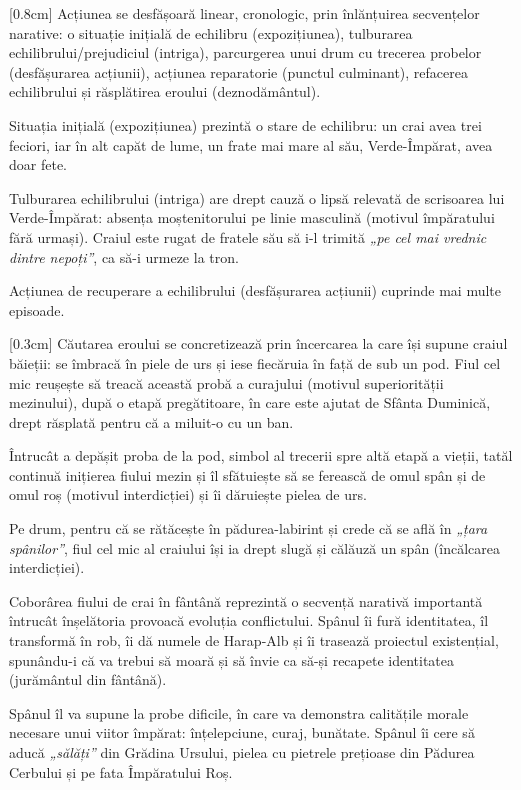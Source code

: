 [0.8cm]
Acțiunea se desfășoară linear, cronologic, prin înlănțuirea secvențelor narative: o situație inițială de echilibru (expozițiunea), tulburarea echilibrului/prejudiciul (intriga), parcurgerea unui drum cu trecerea probelor (desfășurarea acțiunii), acțiunea reparatorie (punctul culminant), refacerea echilibrului și răsplătirea eroului (deznodământul).

Situația inițială (expozițiunea) prezintă o stare de echilibru: un crai avea trei feciori, iar în alt capăt de lume, un frate mai mare al său, Verde-Împărat, avea doar fete.

Tulburarea echilibrului (intriga) are drept cauză o lipsă relevată de scrisoarea lui Verde-Împărat: absența moștenitorului pe linie masculină (motivul împăratului fără urmași). Craiul este rugat de fratele său să i-l trimită \textit{„pe cel mai vrednic dintre nepoți”}, ca să-i urmeze la tron.

Acțiunea de recuperare a echilibrului (desfășurarea acțiunii) cuprinde mai multe episoade.

[0.3cm]
Căutarea eroului se concretizează prin încercarea la care își supune craiul băieții: se îmbracă în piele de urs și iese fiecăruia în față de sub un pod. Fiul cel mic reușește să treacă această probă a curajului (motivul superiorității mezinului), după o etapă pregătitoare, în care este ajutat de Sfânta Duminică, drept răsplată pentru că a \hbox{miluit-o} cu un ban.

Întrucât a depășit proba de la pod, simbol al trecerii spre altă etapă a vieții, tatăl continuă inițierea fiului mezin și îl sfătuiește să se ferească de omul spân și de omul roș (motivul interdicției) și îi dăruiește pielea de urs.

Pe drum, pentru că se rătăcește în pădurea-labirint și crede că se află în \textit{„țara spânilor”}, fiul cel mic al craiului își ia drept slugă și călăuză un spân (încălcarea interdicției).

Coborârea fiului de crai în fântână reprezintă o secvență narativă importantă întrucât înșelătoria provoacă evoluția conflictului. Spânul îi fură identitatea, îl transformă în rob, îi dă numele de Harap-Alb și îi trasează proiectul existențial, spunându-i că va trebui să moară și să învie ca să-și recapete identitatea (jurământul din fântână).

Spânul îl va supune la probe dificile, în care va demonstra calitățile morale necesare unui viitor împărat: înțelepciune, curaj, bunătate. Spânul îi cere să aducă \textit{„sălăți”} din Grădina Ursului, pielea cu pietrele prețioase din Pădurea Cerbului și pe fata Împăratului Roș.

